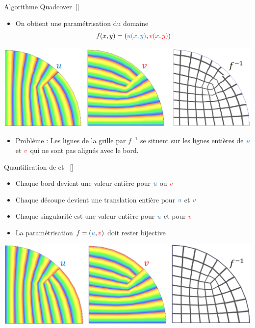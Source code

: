 \begin{frame}{Algorithme Quadcover~[\cite{kalberer_quadcover_2007}]}
    \centering
    \begin{itemize}
        \item On obtient une paramétrisation du domaine \[f(x,y) = (\blue{u(x,y)}, \red{v(x,y)})\]
    \end{itemize}
    
    \includegraphics[width=\linewidth]{img/new_images/u_v_forme_f.png}
    \vspace{-1em}
    \begin{itemize}
        \item Problème : Les lignes de la grille par $f^{-1}$ se situent sur les lignes entières de $\blue{u}$ et ${\color{red}v}$
        qui ne sont pas alignés avec le bord.
    \end{itemize}
\end{frame}

\begin{frame}{Quantification de  et ~[\cite{campen_quantized_2015}]}
    \begin{itemize}
        \item Chaque bord devient une valeur entière pour $\blue{u}$ ou ${\color{red}v}$
        \item Chaque découpe devient une translation entière pour $\blue{u}$ et ${\color{red}v}$
        \item Chaque singularité est une valeur entière pour $\blue{u}$ et pour ${\color{red}v}$
		\item La paramétrisation $f = (\blue{u}, \red{v})$ doit rester bijective
    \end{itemize}
    
    \vspace{1em} %
    \centering
    \includegraphics[width=\linewidth]{img/new_images/uv_quantizee.png}
\end{frame}

